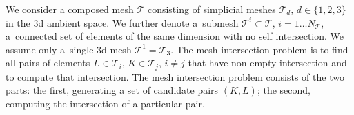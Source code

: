 
We consider a composed mesh $\mathcal T$ consisting of simplicial meshes $\mathcal T_d$, $d\in \{1,2,3\}$ in the 3d ambient space.
We further denote a~submesh $\mathcal T^i \subset \mathcal T$, $i=1\ldots N_\mathcal{T}$, a~connected set of elements of the same dimension with no self intersection. We assume only a~single 3d mesh $\mathcal T^1=\mathcal T_3$.
The mesh intersection problem is to find all pairs of elements $L\in \mathcal{T}_i$, $K\in \mathcal{T}_j$, $i\ne j$ that have non-empty intersection 
and to compute that intersection. The mesh intersection problem consists of the two parts: the first, generating a set of candidate pairs $(K, L)$;
the second, computing the intersection of a particular pair.

